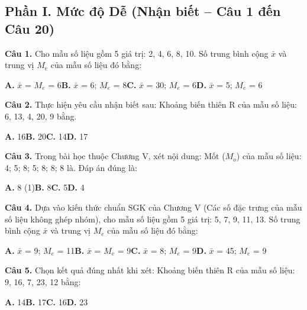 \documentclass[11pt,a4paper]{article}
\begin{document}
\subsection*{\color{accent} Phần I. Mức độ Dễ (Nhận biết -- Câu 1 đến Câu 20)}
\textbf{\color{primary} Câu 1.} Cho mẫu số liệu gồm 5 giá trị: 2, 4, 6, 8, 10. Số trung bình cộng $\bar{x}$ và trung vị $M_e$ của mẫu số liệu đó bằng:\par
\hspace*{1.5em}\textbf{A.} $\bar{x}$ = $M_e$ = 6\quad\quad \textbf{B.} $\bar{x}$ = 6; $M_e$ = 8\quad\quad \textbf{C.} $\bar{x}$ = 30; $M_e$ = 6\quad\quad \textbf{D.} $\bar{x}$ = 5; $M_e$ = 6\par\vspace{2pt}
\textbf{\color{primary} Câu 2.} Thực hiện yêu cầu nhận biết sau: Khoảng biến thiên R của mẫu số liệu: 6, 13, 4, 20, 9 bằng.\par
\hspace*{1.5em}\textbf{A.} 16\quad\quad \textbf{B.} 20\quad\quad \textbf{C.} 14\quad\quad \textbf{D.} 17\par\vspace{2pt}
\textbf{\color{primary} Câu 3.} Trong bài học thuộc Chương V, xét nội dung: Mốt ($M_o$) của mẫu số liệu: 4; 5; 8; 5; 8; 8; 8 là. Đáp án đúng là:\par
\hspace*{1.5em}\textbf{A.} 8 (1)\quad\quad \textbf{B.} 8\quad\quad \textbf{C.} 5\quad\quad \textbf{D.} 4\par\vspace{2pt}
\textbf{\color{primary} Câu 4.} Dựa vào kiến thức chuẩn SGK của Chương V (Các số đặc trưng của mẫu số liệu không ghép nhóm), cho mẫu số liệu gồm 5 giá trị: 5, 7, 9, 11, 13. Số trung bình cộng $\bar{x}$ và trung vị $M_e$ của mẫu số liệu đó bằng:\par
\hspace*{1.5em}\textbf{A.} $\bar{x}$ = 9; $M_e$ = 11\quad\quad \textbf{B.} $\bar{x}$ = $M_e$ = 9\quad\quad \textbf{C.} $\bar{x}$ = 8; $M_e$ = 9\quad\quad \textbf{D.} $\bar{x}$ = 45; $M_e$ = 9\par\vspace{2pt}
\textbf{\color{primary} Câu 5.} Chọn kết quả đúng nhất khi xét: Khoảng biến thiên R của mẫu số liệu: 9, 16, 7, 23, 12 bằng:\par
\hspace*{1.5em}\textbf{A.} 14\quad\quad \textbf{B.} 17\quad\quad \textbf{C.} 16\quad\quad \textbf{D.} 23\par\vspace{2pt}
\end{document}

